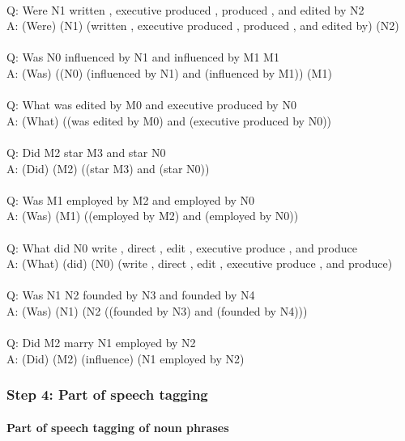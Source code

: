 \documentclass{article} \usepackage{iclr2022_conference,times}
\begin{document}
{ \\
Q: Were N1 written , executive produced , produced , and edited by N2 \\
A: (Were) (N1) (written , executive produced , produced , and edited by) (N2) \\
 \\
Q: Was N0 influenced by N1 and influenced by M1 M1 \\
A: (Was) ((N0) (influenced by N1) and (influenced by M1)) (M1) \\
 \\
Q: What was edited by M0 and executive produced by N0 \\
A: (What) ((was edited by M0) and (executive produced by N0)) \\
 \\
Q: Did M2 star M3 and star N0 \\
A: (Did) (M2) ((star M3) and (star N0)) \\
 \\
Q: Was M1 employed by M2 and employed by N0 \\
A: (Was) (M1) ((employed by M2) and (employed by N0)) \\
 \\
Q: What did N0 write , direct , edit , executive produce , and produce \\
A: (What) (did) (N0) (write , direct , edit , executive produce , and produce) \\
 \\
Q: Was N1 N2 founded by N3 and founded by N4 \\
A: (Was) (N1) (N2 ((founded by N3) and (founded by N4))) \\
 \\
Q: Did M2 marry N1 employed by N2 \\
A: (Did) (M2) (influence) (N1 employed by N2)}

\subsubsection{Step 4: Part of speech tagging}

\paragraph{Part of speech tagging of noun phrases}
\end{document}
